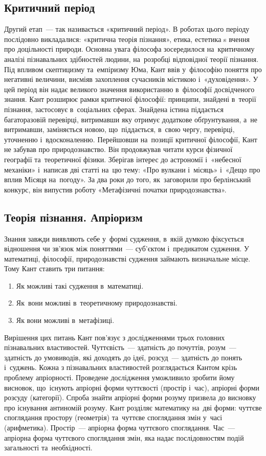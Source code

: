 \documentclass[a5paper,oneside,DIV=12,12pt,headings=small]{scrartcl}
\begin{document}
		\subsection{Критичний період}
			Другий етап~— так називається «критичний період». В роботах цього періоду послідовно викладалися: «критична теорія пізнання», етика, естетика s вчення про доцільності природи. Основна увага філософа зосередилося на~критичному аналізі пізнавальних здібностей людини, на~розробці відповідної теорії пізнання. Під впливом скептицизму та~емпіризму Юма, Кант ввів у~філософію поняття про негативні величини, висміяв захоплення сучасників містикою і~«духовідення». У цей період він надає великого значення використанню в~філософії досвідченого знання. Кант розширює рамки критичної філософії: принципи, знайдені в~теорії пізнання, застосовує в~соціальних сферах. Знайдена істина піддається багаторазовій перевірці, витримавши яку отримує додаткове обґрунтування, а~не витримавши, заміняється новою, що~піддається, в~свою чергу, перевірці, уточненню і~вдосконаленню. Перейшовши на~позиції критичної філософії, Кант не забував про природознавство. Він продовжував читати курси фізичної географії та~теоретичної фізики. Зберігав інтерес до астрономії і~«небесної механіки» і~написав дві статті на~цю тему: «Про вулкани і~місяць» і~«Дещо про вплив Місяця на~погоду». За два роки до того, як~заговорили про берлінський конкурс, він випустив роботу «Метафізичні початки природознавства». 
		
		\subsection{Теорія пізнання. Апріоризм}
			Знання завжди виявляють себе у~формі судження, в~якій думкою фіксується відношення чи зв'язок між поняттями~— суб'єктом і~предикатом судження. У математиці, філософії, природознавстві судження займають визначальне місце. Тому Кант ставить три питання:
			\begin{enumerate}
				\item Як можливі такі судження в~математиці.
				\item Як~вони можливі в~теоретичному природознавстві.
				\item Як вони можливі в~метафізиці.
			\end{enumerate}
			Вирішення цих питань Кант пов'язує з дослідженнями трьох головних пізнавальних властивостей. Чуттєвість~— здатність до почуттів, розум~— здатність до умовиводів, які доходять до ідеї, розсуд~— здатність до понять і~суджень. Кожна з пізнавальних властивостей розглядається Кантом крізь проблему апріорності. Проведене дослідження уможливило зробити йому висновок, що~існують апріорні форми чуттєвості (простір і~час), апріорні форми розсуду (категорії). Спроба знайти апріорні форми розуму призвела до висновку про існування антиномій розуму. Кант розділяє математику на~дві форми: чуттєве споглядання простору (геометрія) та~чуттєве споглядання змін у~часі (арифметика). Простір~— апріорна форма чуттєвого споглядання. Час~— апріорна форма чуттєвого споглядання змін, яка надає послідовностям подій загальності та~необхідності. 
		
\end{document}
